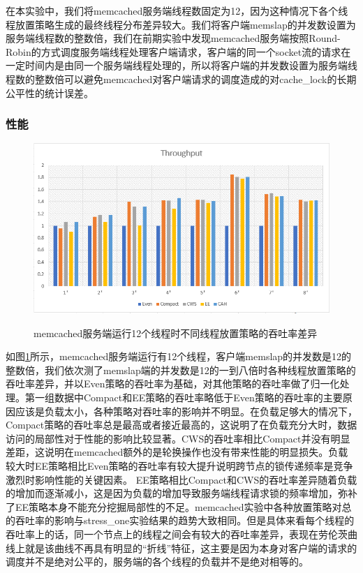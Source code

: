 在本实验中，我们将memcached服务端线程数固定为12，因为这种情况下各个线程放置策略生成的最终线程分布差异较大。我们将客户端memslap的并发数设置为服务端线程数的整数倍，我们在前期实验中发现memcached服务端按照Round-Robin的方式调度服务端线程处理客户端请求，客户端的同一个socket流的请求在一定时间内是由同一个服务端线程处理的，所以将客户端的并发数设置为服务端线程数的整数倍可以避免memcached对客户端请求的调度造成的对cache\_lock的长期公平性的统计误差。
\subsubsection{性能}

\begin{figure}[t]
	\centering
	\includegraphics[width=5.6in]{figure/memcached-throughput.PNG}
	\caption{memcached服务端运行12个线程时不同线程放置策略的吞吐率差异}{}
	\label{Fig:memcached-thrpt}
\end{figure}
如图\ref{Fig:memcached-thrpt}所示，memcached服务端运行有12个线程，客户端memslap的并发数是12的整数倍，我们依次测了memslap端的并发数是12的一到八倍时各种线程放置策略的吞吐率差异，并以Even策略的吞吐率为基础，对其他策略的吞吐率做了归一化处理。第一组数据中Compact和EE策略的吞吐率略低于Even策略的吞吐率的主要原因应该是负载太小，各种策略对吞吐率的影响并不明显。在负载足够大的情况下，Compact策略的吞吐率总是最高或者接近最高的，这说明了在负载充分大时，数据访问的局部性对于性能的影响比较显著。CWS的吞吐率相比Compact并没有明显差距，这说明在memcached额外的是轮换操作也没有带来性能的明显损失。负载较大时EE策略相比Even策略的吞吐率有较大提升说明跨节点的锁传递频率是竞争激烈时影响性能的关键因素。 EE策略相比Compact和CWS的吞吐率差异随着负载的增加而逐渐减小，这是因为负载的增加导致服务端线程请求锁的频率增加，弥补了EE策略本身不能充分挖掘局部性的不足。memcached实验中各种放置策略对总的吞吐率的影响与stress\_one实验结果的趋势大致相同。但是具体来看每个线程的吞吐率上的话，同一个节点上的线程之间会有较大的吞吐率差异，表现在劳伦茨曲线上就是该曲线不再具有明显的“折线”特征，这主要是因为本身对客户端的请求的调度并不是绝对公平的，服务端的各个线程的负载并不是绝对相等的。
